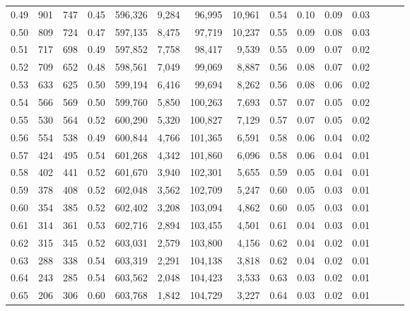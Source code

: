\begin{tabular}{rrrrrrrrrrrrrrr}
0.49 &     901 &    747 &  0.45 &  596,326 &    9,284 &   96,995 &   10,961 &  0.54 &  0.10 &  0.09 &      0.03 \\
0.50 &     809 &    724 &  0.47 &  597,135 &    8,475 &   97,719 &   10,237 &  0.55 &  0.09 &  0.08 &      0.03 \\
0.51 &     717 &    698 &  0.49 &  597,852 &    7,758 &   98,417 &    9,539 &  0.55 &  0.09 &  0.07 &      0.02 \\
0.52 &     709 &    652 &  0.48 &  598,561 &    7,049 &   99,069 &    8,887 &  0.56 &  0.08 &  0.07 &      0.02 \\
0.53 &     633 &    625 &  0.50 &  599,194 &    6,416 &   99,694 &    8,262 &  0.56 &  0.08 &  0.06 &      0.02 \\
0.54 &     566 &    569 &  0.50 &  599,760 &    5,850 &  100,263 &    7,693 &  0.57 &  0.07 &  0.05 &      0.02 \\
0.55 &     530 &    564 &  0.52 &  600,290 &    5,320 &  100,827 &    7,129 &  0.57 &  0.07 &  0.05 &      0.02 \\
0.56 &     554 &    538 &  0.49 &  600,844 &    4,766 &  101,365 &    6,591 &  0.58 &  0.06 &  0.04 &      0.02 \\
0.57 &     424 &    495 &  0.54 &  601,268 &    4,342 &  101,860 &    6,096 &  0.58 &  0.06 &  0.04 &      0.01 \\
0.58 &     402 &    441 &  0.52 &  601,670 &    3,940 &  102,301 &    5,655 &  0.59 &  0.05 &  0.04 &      0.01 \\
0.59 &     378 &    408 &  0.52 &  602,048 &    3,562 &  102,709 &    5,247 &  0.60 &  0.05 &  0.03 &      0.01 \\
0.60 &     354 &    385 &  0.52 &  602,402 &    3,208 &  103,094 &    4,862 &  0.60 &  0.05 &  0.03 &      0.01 \\
0.61 &     314 &    361 &  0.53 &  602,716 &    2,894 &  103,455 &    4,501 &  0.61 &  0.04 &  0.03 &      0.01 \\
0.62 &     315 &    345 &  0.52 &  603,031 &    2,579 &  103,800 &    4,156 &  0.62 &  0.04 &  0.02 &      0.01 \\
0.63 &     288 &    338 &  0.54 &  603,319 &    2,291 &  104,138 &    3,818 &  0.62 &  0.04 &  0.02 &      0.01 \\
0.64 &     243 &    285 &  0.54 &  603,562 &    2,048 &  104,423 &    3,533 &  0.63 &  0.03 &  0.02 &      0.01 \\
0.65 &     206 &    306 &  0.60 &  603,768 &    1,842 &  104,729 &    3,227 &  0.64 &  0.03 &  0.02 &      0.01 \\

\end{tabular}
